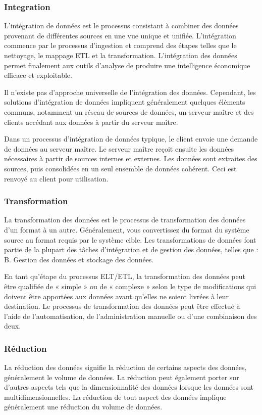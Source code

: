         \subsubsection{Integration}
        L'intégration de données est le processus consistant à combiner des données provenant de différentes sources en une vue unique et unifiée. L'intégration commence par le processus d'ingestion et comprend des étapes telles que le nettoyage, le mappage ETL et la transformation. L'intégration des données permet finalement aux outils d'analyse de produire une intelligence économique efficace et exploitable.

        Il n'existe pas d'approche universelle de l'intégration des données. Cependant, les solutions d'intégration de données impliquent généralement quelques éléments communs, notamment un réseau de sources de données, un serveur maître et des clients accédant aux données à partir du serveur maître.

        Dans un processus d'intégration de données typique, le client envoie une demande de données au serveur maître. Le serveur maître reçoit ensuite les données nécessaires à partir de sources internes et externes. Les données sont extraites des sources, puis consolidées en un seul ensemble de données cohérent. Ceci est renvoyé au client pour utilisation.
        \subsubsection{Transformation}
        La transformation des données est le processus de transformation des données d'un format à un autre. Généralement, vous convertissez du format du système source au format requis par le système cible. Les transformations de  données font partie de la plupart des tâches d'intégration et de gestion des données, telles que : B. Gestion des données et stockage des données. 

        En tant qu'étape du processus ELT/ETL, la transformation des données peut être qualifiée de « simple » ou de « complexe » selon le type de modifications qui doivent être apportées aux données avant qu'elles ne soient livrées à leur destination. Le processus de transformation des données peut être effectué à l'aide de l'automatisation, de l'administration manuelle ou d'une combinaison des deux.

        \subsubsection{Réduction}
        La réduction des données signifie la réduction de certains aspects des données, généralement le volume de données. La réduction peut également porter sur d'autres aspects tels que la dimensionnalité des données lorsque les données sont multidimensionnelles. La réduction de tout aspect des données implique généralement une réduction du volume de données.

